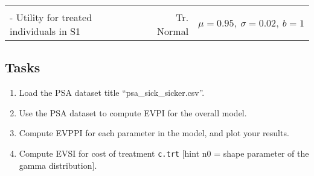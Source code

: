\documentclass[]{article}
\begin{document}
\begin{longtable}[]{@{}lrr@{}}
\begin{minipage}[t]{0.17\columnwidth}
\strut
\end{minipage} & \begin{minipage}[t]{0.42\columnwidth}\raggedleft\strut
\strut
\end{minipage}\tabularnewline
\begin{minipage}[t]{0.32\columnwidth}\raggedright\strut
- Utility for treated individuals in S1\strut
\end{minipage} & \begin{minipage}[t]{0.17\columnwidth}\raggedleft\strut
Tr. Normal\strut
\end{minipage} & \begin{minipage}[t]{0.42\columnwidth}\raggedleft\strut
\(\mu = 0.95, \ \sigma = 0.02, \ b = 1\)\strut
\end{minipage}\tabularnewline
\bottomrule
\end{longtable}

\subsection{Tasks}\label{tasks}

\begin{enumerate}
\def\labelenumi{\arabic{enumi}.}
\item
  Load the PSA dataset title ``psa\_sick\_sicker.csv''.
\item
  Use the PSA dataset to compute EVPI for the overall model.
\item
  Compute EVPPI for each parameter in the model, and plot your results.
\item
  Compute EVSI for cost of treatment \texttt{c.trt} {[}hint n0 = shape
  parameter of the gamma distribution{]}.
\end{enumerate}
\end{document}
